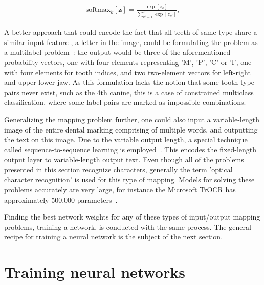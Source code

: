 \documentclass[english,twoside,openright]{UH_DS_MSc}
\begin{document}
\begin{align}
    \text{softmax}_k[\mathbf{z}] = \frac{\exp[z_k]}{\sum_{k'=1}^{K} \exp[z_{k'}]},
    \label{eq:softmax}
\end{align}

A better approach that could encode the fact that all teeth of same type share a similar input feature
, a letter in the image, could be formulating the problem as a multilabel
problem~\cite{multilabel_classification}: the output would be three of the aforementioned 
probability vectors, one with four elements representing 'M', 'P', 'C' or 'I', one with four elements 
for tooth indices, and two two-element vectors for left-right and upper-lower jaw. As this 
formulation lacks the notion that some tooth-type pairs never exist, such as the 4th canine,
this is a case of constrained multiclass classification, where some label pairs are marked 
as impossible combinations.

Generalizing the mapping problem further, one could also input a variable-length image 
of the entire dental marking comprising of multiple words, and outputting the text on this image.
Due to the variable output length, a special technique called sequence-to-sequence learning 
is employed~\cite{sutskever2014sequence}. This encodes the fixed-length output layer to variable-length 
output text. Even though all of the problems presented in this section recognize characters, 
generally the term 'optical character recognition' is used for this type of mapping. Models
for solving these problems accurately are very large, for instance the Microsoft TrOCR has approximately 
500,000 parameters~\cite{li2021trocr}.

Finding the best network weights for any of these types of input/output mapping problems, training 
a network, is conducted with the same process.
The general recipe for training a neural network is the subject of the next section.

\section{Training neural networks}
\label{sect:training}
\end{document}
